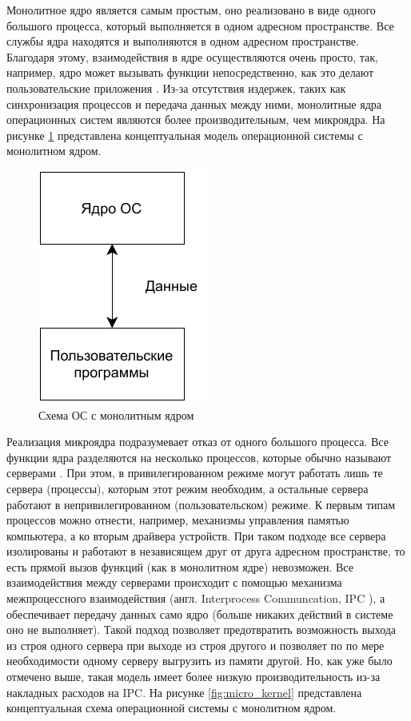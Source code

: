 Монолитное ядро является самым простым, оно реализовано в виде одного большого процесса, который выполняется в одном адресном пространстве. Все службы ядра находятся и выполняются в одном адресном пространстве. Благодаря этому, взаимодействия в ядре осуществляются очень просто, так, например, ядро может вызывать функции непосредственно, как это делают пользовательские приложения \cite{kernel-development}. Из-за отсутствия издержек, таких как синхронизация процессов и передача данных между ними, монолитные ядра операционных систем являются более производительным, чем микроядра. На рисунке \ref{fig:monolithic kernel} представлена концептуальная модель операционной системы с монолитном ядром.

\begin{figure}[h]
	\centering
	\includegraphics[scale=2]{img/monolithic_kernel.pdf}
	\caption{Схема ОС с монолитным ядром}
	\label{fig:monolithic kernel}
\end{figure}
 
Реализация микроядра подразумевает отказ от одного большого процесса. Все функции ядра разделяются на несколько процессов, которые обычно называют серверами \cite{kernel-development}. При этом, в привилегированном режиме могут работать лишь те сервера (процессы), которым этот режим необходим, а остальные сервера работают в непривилегированном (пользовательском) режиме. К первым типам процессов можно отнести, например, механизмы управления памятью компьютера, а ко вторым драйвера устройств. При таком подходе все сервера изолированы и работают в независящем друг от друга адресном пространстве, то есть прямой вызов функций (как в монолитном ядре) невозможен. Все взаимодействия между серверами происходит с помощью механизма межпроцессного взаимодействия (англ. Interprocess Communcation, IPC \cite{ipc}), а обеспечивает передачу данных само ядро (больше никаких действий в системе оно не выполняет). Такой подход позволяет предотвратить возможность выхода из строя одного сервера при выходе из строя другого и позволяет по по мере необходимости одному серверу выгрузить из памяти другой. Но, как уже было отмечено выше, такая модель имеет более низкую производительность из-за накладных расходов на IPC. На рисунке \ref{fig:micro_kernel} представлена концептуальная схема операционной системы с монолитном ядром. 

